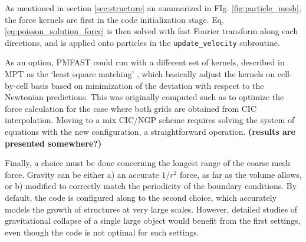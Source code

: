 As mentioned in section \ref{sec:structure} an summarized in FIg. \ref{fig:particle_mesh},
the force kernels are first  in the code initialization stage.
Eq. \ref{eq:poisson_solution_force} is then solved with fast Fourier transform along each directions, 
 and is applied onto particles in the {\tt update\_velocity} subroutine.

As an option, {\small PMFAST} could run with a different set of kernels, described in MPT as the `least square matching' , 
which basically adjust the kernels on cell-by-cell basis based on minimization of the deviation with respect
to the Newtonian predictions. This was originally computed such as to optimize the force calculation for
the case where both grids are obtained from CIC interpolation. Moving to a mix CIC/NGP scheme
requires solving the system of equations with the new configuration, a straightforward operation. 
{\bf (results are presented somewhere?)}

Finally, a choice must be done concerning the longest range of the coarse mesh force. Gravity can be either a) an accurate $1/r^2$ force, as far as the volume allows, 
or b) modified to correctly match the periodicity of the boundary conditions. By default, the code is configured along to the second choice,
which accurately models the growth of structures at very large scales. However, detailed studies of gravitational collapse of a single large object would benefit 
from the first settings, even though the code is not optimal for such settings.

